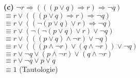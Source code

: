 \documentclass[a4paper]{scrartcl}
\begin{document}
\begin{flushleft}
		 \textbf{(c)} 
		 $\neg r \Rightarrow (((p\vee q) \Rightarrow r) \Rightarrow \neg q)$\\
		 $\equiv r \vee (((p\vee q) \Rightarrow r) \Rightarrow \neg q)$\\
		 $\equiv r \vee ((\neg(p\vee q) \vee r) \Rightarrow \neg q)$\\
		 $\equiv r \vee (\neg(\neg(p\vee q) \vee r) \vee \neg q)$\\
		 $\equiv r \vee (((p\vee q) \wedge \neg r) \vee \neg q)$\\
		 $\equiv r \vee (((p \wedge\neg r)\vee (q\wedge\neg r)) \vee \neg q)$\\
		 $\equiv r \vee \neg q \vee (p \wedge\neg r)\vee (q\wedge\neg r)$\\
		 $\equiv r \vee \neg q \vee p \vee q$\\
		 $\equiv 1 $ (Tautologie)\\
		 
 	\end{flushleft}
\end{document}
